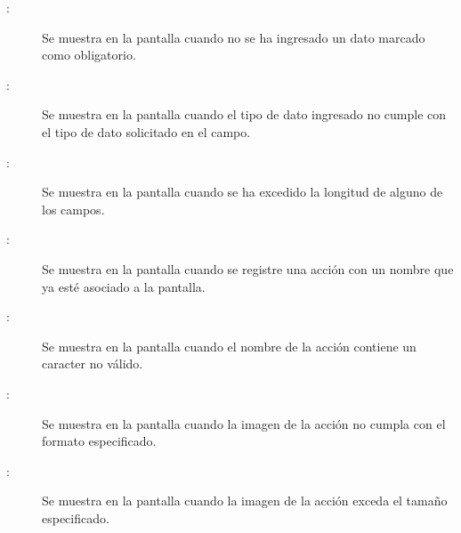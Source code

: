 	
\begin{description}
	\item[:] Se muestra en la pantalla  cuando no se ha ingresado un dato marcado como obligatorio.
	\item[:] Se muestra en la pantalla  cuando el tipo de dato ingresado no cumple con el tipo de dato solicitado en el campo.
	\item[:] Se muestra en la pantalla  cuando se ha excedido la longitud de alguno de los campos.
	\item[:] Se muestra en la pantalla  cuando se registre una acción con un nombre que ya esté asociado a la pantalla.
	\item[:] Se muestra en la pantalla  cuando el nombre de la acción contiene un caracter no válido.
	\item[:] Se muestra en la pantalla  cuando la imagen de la acción no cumpla con el formato especificado.
	\item[:] Se muestra en la pantalla  cuando la imagen de la acción exceda el tamaño especificado.
\end{description}
